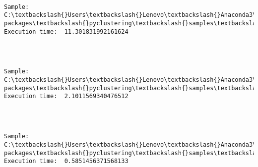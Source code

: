 \documentclass[11pt]{article}
\begin{document}
    \begin{center}
    \end{center}
    { \hspace*{\fill} \\}
    
    \begin{Verbatim}[commandchars=\\\{\}]
Sample:  C:\textbackslash{}Users\textbackslash{}Lenovo\textbackslash{}Anaconda3\textbackslash{}lib\textbackslash{}site-packages\textbackslash{}pyclustering\textbackslash{}samples\textbackslash{}samples\textbackslash{}fcps\textbackslash{}Chainlink.data 		Execution time:  11.301831992161624 


    \end{Verbatim}

    \begin{center}
    \end{center}
    { \hspace*{\fill} \\}
    
    \begin{Verbatim}[commandchars=\\\{\}]
Sample:  C:\textbackslash{}Users\textbackslash{}Lenovo\textbackslash{}Anaconda3\textbackslash{}lib\textbackslash{}site-packages\textbackslash{}pyclustering\textbackslash{}samples\textbackslash{}samples\textbackslash{}fcps\textbackslash{}Tetra.data 		Execution time:  2.1011569340476512 


    \end{Verbatim}

    \begin{center}
    \end{center}
    { \hspace*{\fill} \\}
    
    \begin{Verbatim}[commandchars=\\\{\}]
Sample:  C:\textbackslash{}Users\textbackslash{}Lenovo\textbackslash{}Anaconda3\textbackslash{}lib\textbackslash{}site-packages\textbackslash{}pyclustering\textbackslash{}samples\textbackslash{}samples\textbackslash{}fcps\textbackslash{}Hepta.data 		Execution time:  0.5851456371568133 


    \end{Verbatim}
\end{document}
